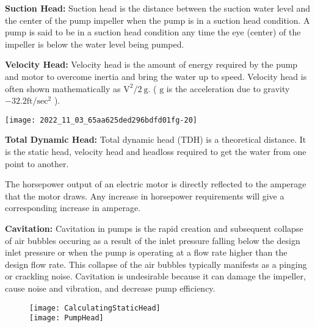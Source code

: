\textbf{Suction Head: } Suction head is the distance between the suction water level and the center of the pump impeller when the pump is in a suction head condition. A pump is said to be in a suction head condition any time the eye (center) of the impeller is below the water level being pumped.

\textbf{Velocity Head: } Velocity head is the amount of energy required by the pump and motor to overcome inertia and bring the water up to speed. Velocity head is often shown mathematically as $\mathrm{V}^{2} / 2 \mathrm{~g}$. ( $\mathrm{g}$ is the acceleration due to gravity $-32.2 \mathrm{ft} / \mathrm{sec}^{2}$ ).
\begin{center}
\texttt{[image: 2022\_11\_03\_65aa625ded296bdfd01fg-20]}
\end{center}
\textbf{Total Dynamic Head: }  Total dynamic head (TDH) is a theoretical distance. It is the static head, velocity head and headloss required to get the water from one point to another.

The horsepower output of an electric motor is directly reflected to the amperage that the motor draws. Any increase in horsepower requirements will give a corresponding increase in amperage.

\textbf{Cavitation: }  Cavitation in pumps is the rapid creation and subsequent collapse of air bubbles occuring as a result of the inlet pressure falling below the design inlet pressure or when the pump is operating at a flow rate higher than the design flow rate. This collapse of the air bubbles typically manifests as a pinging or crackling noise.  Cavitation is undesirable because it can damage the impeller, cause noise and vibration, and decrease pump efficiency.

\begin{figure}[h]
\begin{center}
\texttt{[image: CalculatingStaticHead]}\\
\texttt{[image: PumpHead]}\\
\end{center}
\end{figure}

